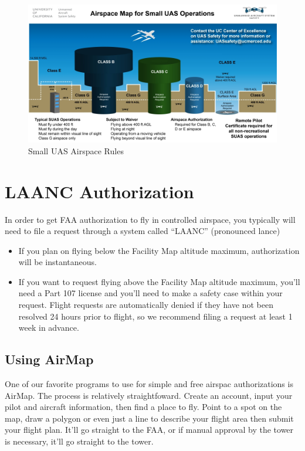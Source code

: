 \documentclass[
  12pt,
]{book}
\providecommand{\tightlist}{%
  \setlength{\itemsep}{0pt}\setlength{\parskip}{0pt}}
\begin{document}
\begin{figure}

{\centering \includegraphics[width=0.9\linewidth]{images/SUAS_airspace_map} 

}

\caption{Small UAS Airspace Rules}\label{fig:SUAS-sim-regs}
\end{figure}

\hypertarget{LAANC}{%
\section{LAANC Authorization}\label{LAANC}}

In order to get FAA authorization to fly in controlled airspace, you typically will need to file a request through a system called ``LAANC'' (pronounced lance)

\begin{itemize}
\tightlist
\item
  If you plan on flying below the Facility Map altitude maximum, authorization will be instantaneous.
\item
  If you want to request flying above the Facility Map altitude maximum, you'll need a Part 107 license and you'll need to make a safety case within your request. Flight requests are automatically denied if they have not been resolved 24 hours prior to flight, so we recommend filing a request at least 1 week in advance.
\end{itemize}

\hypertarget{using-airmap}{%
\subsection{Using AirMap}\label{using-airmap}}

One of our favorite programs to use for simple and free airspac authorizations is AirMap. The process is relatively straightfoward. Create an account, input your pilot and aircraft information, then find a place to fly. Point to a spot on the map, draw a polygon or even just a line to describe your flight area then submit your flight plan. It'll go straight to the FAA, or if manual approval by the tower is necessary, it'll go straight to the tower.
\end{document}
